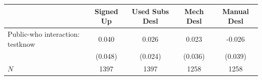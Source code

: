 \begin{tabular}{lcccc}
\hline\hline
 & Signed Up & Used Subs Desl & Mech Desl & Manual Desl \\
\hline
Public-who interaction: testknow & 0.040 & 0.026 & 0.023 & -0.026 \\
 & (0.048) & (0.024) & (0.036) & (0.039) \\
\hline
$N$ & 1397 & 1397 & 1258 & 1258 \\
\hline\hline
\end{tabular}
